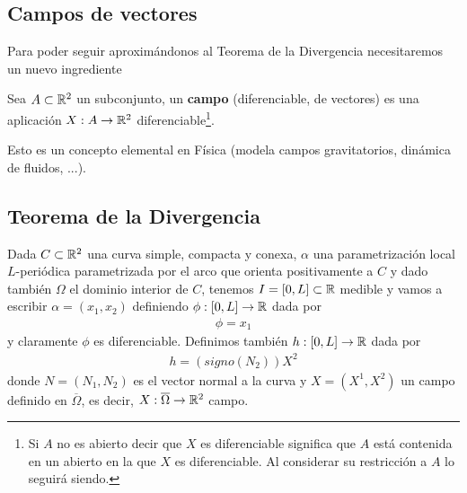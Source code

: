 \subsection{Campos de vectores}

Para poder seguir aproximándonos al Teorema de la Divergencia necesitaremos un nuevo ingrediente
\begin{definicion}
    Sea $A\subset \mathbb{R}^2$ un subconjunto, un \textbf{campo} (diferenciable, de vectores) es una aplicación $X:A \to \mathbb{R}^2$ diferenciable\footnote{Si $A$ no es abierto decir que $X$ es diferenciable significa que $A$ está contenida en un abierto en la que $X$ es diferenciable. Al considerar su restricción a $A$ lo seguirá siendo.}.
    
    \begin{figure}[H]
        \centering
    \end{figure}
\end{definicion}
Esto es un concepto elemental en Física (modela campos gravitatorios, dinámica de fluidos, ...).

\subsection{Teorema de la Divergencia}

Dada $C\subset \mathbb{R}^2$ una curva simple, compacta y conexa, $\alpha$ una parametrización local $L$-periódica parametrizada por el arco que orienta positivamente a $C$ y dado también $\Omega$ el dominio interior de $C$, tenemos $I=[0,L]\subset \mathbb{R}$ medible y vamos a escribir $\alpha=(x_1, x_2)$ definiendo $\phi: [0,L]\to \mathbb{R}$ dada por
\begin{gather*}
    \phi = x_1
\end{gather*}
y claramente $\phi$ es diferenciable. Definimos también $h:[0,L]\to \mathbb{R}$ dada por
\begin{gather*}
    h = (signo(N_2))X^2
\end{gather*}
donde $N = (N_1, N_2)$ es el vector normal a la curva y $X=(X^1, X^2)$ un campo definido en $\overline{\Omega}$, es decir, $X: \overline{\Omega} \to \mathbb{R}^2$ campo. \\

